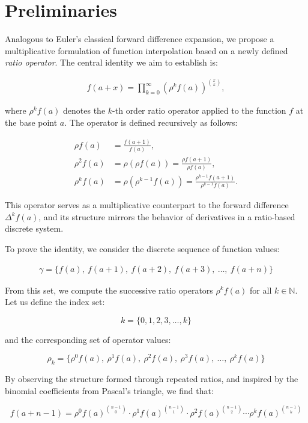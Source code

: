 \section{Preliminaries}

Analogous to Euler's classical forward difference expansion, we propose a multiplicative formulation of function interpolation based on a newly defined \textit{ratio operator}. The central identity we aim to establish is:

\begin{align}
f(a + x) = \prod_{k=0}^{\infty} \left( \rho^k f(a) \right)^{\binom{x}{k}},
\end{align}

where $\rho^k f(a)$ denotes the $k$-th order ratio operator applied to the function $f$ at the base point $a$. The operator is defined recursively as follows:

\begin{align}
\rho f(a) &= \frac{f(a+1)}{f(a)}, \\
\rho^2 f(a) &= \rho\left(\rho f(a)\right) = \frac{\rho f(a+1)}{\rho f(a)}, \\
\rho^k f(a) &= \rho\left( \rho^{k-1} f(a) \right) = \frac{\rho^{k-1} f(a+1)}{\rho^{k-1} f(a)}.
\end{align}

This operator serves as a multiplicative counterpart to the forward difference $\Delta^k f(a)$, and its structure mirrors the behavior of derivatives in a ratio-based discrete system. 

To prove the identity, we consider the discrete sequence of function values:

\begin{align*}
\gamma = \{ f(a),\ f(a+1),\ f(a+2),\ f(a+3),\ \dots,\ f(a+n) \}
\end{align*}

From this set, we compute the successive ratio operators $\rho^k f(a)$ for all $k \in \mathbb{N}$. Let us define the index set:

\[
k = \{0, 1, 2, 3, \dots, k\}
\]

and the corresponding set of operator values:

\[
\rho_k = \{ \rho^0 f(a),\ \rho^1 f(a),\ \rho^2 f(a),\ \rho^3 f(a),\ \dots,\ \rho^k f(a) \}
\]

By observing the structure formed through repeated ratios, and inspired by the binomial coefficients from Pascal's triangle, we find that:

\[
f(a + n - 1) = \rho^0 f(a)^{\binom{n-1}{0}} \cdot \rho^1 f(a)^{\binom{n-1}{1}} \cdot \rho^2 f(a)^{\binom{n-1}{2}} \cdots \rho^k f(a)^{\binom{n-1}{k}}
\]


